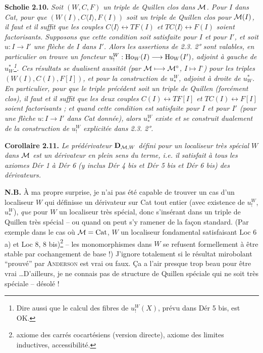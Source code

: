 \textbf{Scholie 2.10.} \textit{Soit $(W,C,F)$ un triple de Quillen clos dans $\mathcal{M}$. Pour $I$ dans \textup{Cat}, pour que $(W(I),C\langle I\rangle,F(I))$ soit un triple de Quillen clos pour $\mathcal{M}(I)$, il faut et il suffit que les couples $C\langle I\rangle\longleftrightarrow TF(I)$ et $TC\langle I\rangle\longleftrightarrow F(I)$ soient factorisants. Supposons que cette condition soit satisfaite pour $I$ et pour $I'$, et soit $u : I\longrightarrow I'$ une flèche de $I$ dans $I'$. Alors les assertions de \textup{2.3. 2°} sont valables, en particulier on trouve un foncteur $u^{W}_{!} : \mathrm{Ho}_W(I)\longrightarrow\mathrm{Ho}_W(I')$, adjoint à gauche de $u^{*}_{W}$\footnote[18]{Dire aussi que le calcul des fibres de $u^{W}_{!}(X)$, prévu dans Dér 5 bis, est OK.}. Ces résultats se dualisent aussitôt (par $\mathcal{M}\longmapsto\mathcal{M}^{\circ}$, $I\longmapsto I^{\circ}$) pour les triples $(W(I),C(I),F[I])$, et pour la construction de $u^{W}_{*}$, adjoint à droite de $u^{*}_{W}$. En particulier, pour que le triple précédent soit un triple de Quillen (forcément clos), il faut et il suffit que les deux couples $C(I)\longleftrightarrow TF[I]$ et $TC(I)\longleftrightarrow F[I]$ soient factorisants ; et quand cette condition est satisfaite pour $I$ et pour $I'$ (pour une flèche $u : I\longrightarrow I'$ dans \textup{Cat} donnée), alors $u^{W}_{*}$ existe et se construit dualement de la construction de $u^{W}_{!}$ explicitée dans \textup{2.3. 2°}.}

\textbf{Corollaire 2.11.} \textit{Le prédérivateur $\mathbf{D}_{\mathcal{M},W}$ défini pour un localiseur \textup{très spécial} $W$ dans $\mathcal{M}$ est un dérivateur en plein sens du terme, i.e. il satisfait à tous les axiomes Dér 1 à Dér 6 (y inclus Dér 4 bis et Dér 5 bis et Dér 6 bis) des dérivateurs.}

\textbf{N.B.} À ma propre surprise, je n'ai pas été capable de trouver un cas d'un localiseur $W$ qui définisse un dérivateur sur Cat tout entier (avec existence de $u^{W}_{!}$, $u^{W}_{*}$), \textit{que} pour $W$ un localiseur très spécial, donc s'insérant dans un triple de Quillen très spécial -- ou quand on peut s'y ramener de la façon standard. (Par exemple dans le cas où $\mathcal{M}=\mathrm{Cat}$, $W$ un localiseur fondamental satisfaisant Loc 6 a) et Loc 8, 8 bis)\footnote[19]{axiome des carrés cocartésiens (version directe), axiome des limites inductives, accessibilité.} -- les monomorphismes dans $W$ se refusent formellement à être stable par cochangement de base !) J'ignore totalement si le résultat mirobolant ``prouvé'' par \textsc{Anderson} est vrai ou faux. Ça a l'air presque trop beau pour être vrai \ldots{}D'ailleurs, je ne connais pas de structure de Quillen spéciale qui ne soit très spéciale -- désolé ! %

